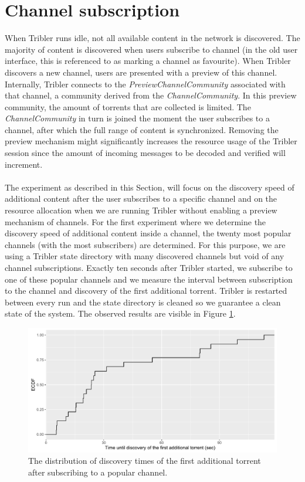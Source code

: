 \section{Channel subscription}
When Tribler runs idle, not all available content in the network is discovered. The majority of content is discovered when users subscribe to channel (in the old user interface, this is referenced to as marking a channel as favourite). When Tribler discovers a new channel, users are presented with a preview of this channel. Internally, Tribler connects to the \emph{PreviewChannelCommunity} associated with that channel, a community derived from the \emph{ChannelCommunity}. In this preview community, the amount of torrents that are collected is limited. The \emph{ChannelCommunity} in turn is joined the moment the user subscribes to a channel, after which the full range of content is synchronized. Removing the preview mechanism might significantly increases the resource usage of the Tribler session since the amount of incoming messages to be decoded and verified will increment.\\\\
The experiment as described in this Section, will focus on the discovery speed of additional content after the user subscribes to a specific channel and on the resource allocation when we are running Tribler without enabling a preview mechanism of channels. For the first experiment where we determine the discovery speed of additional content inside a channel, the twenty most popular channels (with the most subscribers) are determined. For this purpose, we are using a Tribler state directory with many discovered channels but void of any channel subscriptions. Exactly ten seconds after Tribler started, we subscribe to one of these popular channels and we measure the interval between subscription to the channel and discovery of the first additional torrent. Tribler is restarted between every run and the state directory is cleaned so we guarantee a clean state of the system. The observed results are visible in Figure \ref{fig:channel_subscription}.

\begin{figure}[!h]
	\centering
	\includegraphics[width=1.0\columnwidth]{images/experiments/channel_subscription}
	\caption{The distribution of discovery times of the first additional torrent after subscribing to a popular channel.}
	\label{fig:channel_subscription}
\end{figure}

